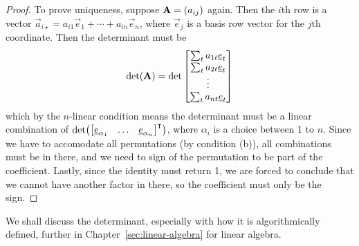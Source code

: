 \begin{proof}
    To prove uniqueness, suppose \(\vb{A} = (a_{ij})\) again.
    Then the \(i\)th row is a vector
    \(\vec{a}_{i\star} = a_{i1}\vec{e}_1 + \cdots + a_{in}\vec{e}_n\),
    where \(\vec{e}_j\) is a basis row vector for the \(j\)th coordinate.
    Then the determinant must be
    \begin{equation*}
        \det(\vb{A}) = \det\begin{bmatrix}
            \sum_t a_{1t}\underline{e}_t \\
            \sum_t a_{2t}\underline{e}_t \\
            \vdots \\
            \sum_t a_{nt}\underline{e}_t
        \end{bmatrix}
    \end{equation*}
    which by the \(n\)-linear condition means
    the determinant must be a linear combination of
    \(\det({\mqty[\vec{e}_{\alpha_1} & \hdots & \vec{e}_{\alpha_n}]}^\intercal)\),
    where \(\alpha_i\) is a choice between 1 to \(n\).
    Since we have to accomodate all permutations (by condition (b)),
    all combinations must be in there,
    and we need to sign of the permutation to be part of the coefficient.
    Lastly, since the identity must return 1,
    we are forced to conclude that we cannot have another factor in there,
    so the coefficient must only be the sign.
\end{proof}
\begin{remark}
    We shall discuss the determinant,
    especially with how it is algorithmically defined,
    further in Chapter~\ref{sec:linear-algebra} for linear algebra.
\end{remark}

